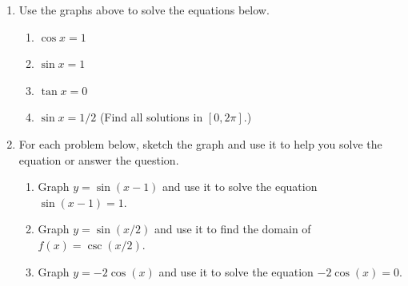 \documentclass[11pt,fleqn]{article}
\begin{document}
\begin{enumerate}
\item Use the graphs above to solve the equations below.
\begin{multicols}{2}
\begin{enumerate}
\item $\cos x =1$
\vspace{.5in}
\item $\sin x =1$
\vspace{1in}
\columnbreak
\item $\tan x = 0$
\vspace{1in}
\item $\sin x = 1/2$ (Find all solutions in $[0,2\pi].$)
\vspace{.5in}
\end{enumerate}
\end{multicols}
\vspace{.5in}
\newpage
\item For each problem below, sketch the graph and use it to help you solve the equation or answer the question.
\begin{enumerate}
\item Graph $y=\sin(x-1)$ and use it to solve the equation $\sin(x-1)=1.$
\vfill
\item Graph $y=\sin(x/2)$ and use it to find the domain of  $f(x)=\csc(x/2).$
\vfill
\item Graph $y=-2\cos(x)$ and use it to solve the equation $-2\cos(x)=0.$
\vfill
\end{enumerate}

\end{enumerate}
\end{document}
